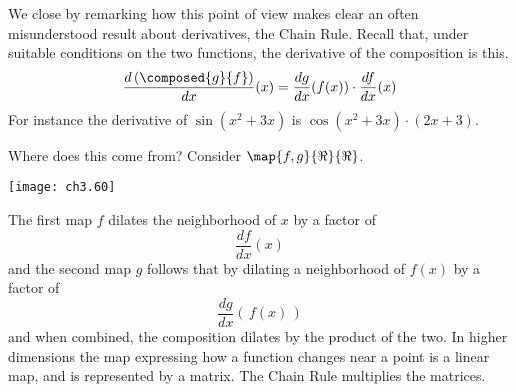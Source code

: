 We close by remarking how
this point of view makes clear an often misunderstood  
result about derivatives, the Chain Rule.
Recall that, under suitable conditions on the two functions,
the derivative of the composition is this.
\begin{equation*}
  \frac{d\,(\composed{g}{f})}{dx}(x) = 
  \frac{dg}{dx}(f(x))\cdot\frac{df}{dx}(x)
\end{equation*} 
For instance the derivative of $\sin(x^2+3x)$ is
$\cos(x^2+3x)\cdot(2x+3)$.

Where does this come from?
Consider $\map{f,g}{\Re}{\Re}$. 
\begin{center}
  \texttt{[image: ch3.60]}
\end{center}
The first map $f$ dilates the neighborhood of $x$ by a factor of 
\begin{equation*}
  \frac{df}{dx}(x) 
\end{equation*}
and the second map $g$ follows that by dilating 
a neighborhood of $f(x)$ by a factor of 
\begin{equation*}
  \frac{dg}{dx}(\,f(x)\,) 
\end{equation*}
and when combined, 
the composition dilates by the product of the two.
In higher dimensions 
the map expressing how a function changes near a point is a linear map,
and is represented by a matrix.
The Chain Rule multiplies the matrices.


